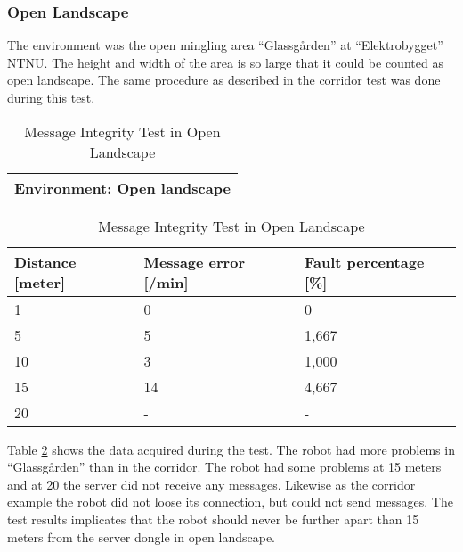 \newpage
\subsubsection{Open Landscape}
The environment was the open mingling area ``Glassgården'' at ``Elektrobygget'' NTNU. The height and width of the area is so large that it could be counted as open landscape.
The same procedure as described in the corridor test was done during this test.

\begin{table}[ht]
\begin{center}
 \begin{tabular}{|p{130pt}|} 
 \hline
 Environment: \textbf{Open landscape}\\
 \hline
 \end{tabular}
 \begin{tabular}{|p{90pt}|p{100pt}|p{90pt}|}
 \hline
 Distance [meter] & Message error [/min] &  Fault percentage [\%]\\
 \hline
 1		        &   0 		&	0    \\
 5              &   5  		&	1,667\\
 10             &   3  		&	1,000\\
 15				&	14 		&	4,667\\
 20				&	-  		&	-	\\
 \hline
\end{tabular}
\end{center}
\caption{Message Integrity Test in Open Landscape}
\label{tab:messintegrityopen}
\end{table}

Table \ref{tab:messintegrityopen} shows the data acquired during the test. The robot had more problems in ``Glassgården'' than in the corridor. The robot had some problems at 15 meters and at 20 the server did not receive any messages. Likewise as the corridor example the robot did not loose its connection, but could not send messages. The test results implicates that the robot should never be further apart than 15 meters from the server dongle in open landscape.